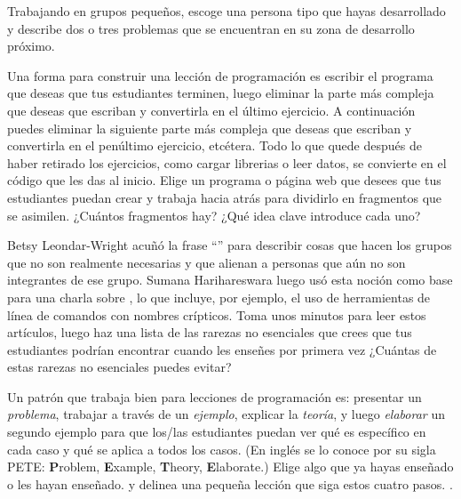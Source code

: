 Trabajando en grupos pequeños,
escoge una persona tipo que hayas desarrollado
y describe dos o tres problemas que se encuentran en su zona de desarrollo próximo.
 
 
Una forma para construir una lección de programación
es escribir el programa que deseas que tus estudiantes terminen,
luego eliminar la parte más compleja que deseas que escriban
y convertirla en el último ejercicio.
A continuación puedes eliminar la siguiente parte más compleja que deseas que escriban
y convertirla en el penúltimo ejercicio, etcétera.
Todo lo que quede después de haber retirado los ejercicios,
como cargar librerias o leer datos,
se convierte en el código que les das al inicio.
 Elige un programa o página web que desees que
tus estudiantes puedan crear
y trabaja hacia atrás para dividirlo en fragmentos que se asimilen.
¿Cuántos fragmentos hay?
¿Qué idea clave introduce cada uno?
 
 
Betsy Leondar-Wright acuñó la frase
``''
para describir cosas que hacen los grupos
que no son realmente necesarias y
que alienan a personas que aún no son integrantes de ese grupo.
Sumana Harihareswara luego usó esta noción
como base para una charla sobre
,
lo que incluye, por ejemplo, el uso de herramientas de línea de comandos con nombres crípticos.
Toma unos minutos para leer estos artículos,
luego haz una lista de las rarezas no esenciales que crees
que tus estudiantes podrían encontrar
cuando les enseñes por primera vez
¿Cuántas de estas rarezas no esenciales puedes evitar?
 

Un patrón que trabaja bien para lecciones de programación es:
presentar un \emph{problema},
trabajar a través de un \emph{ejemplo},
explicar la \emph{teoría},
y luego \emph{elaborar} un segundo ejemplo
para que los/las estudiantes puedan ver qué es específico en cada caso
y qué se aplica a todos los casos. (En inglés se lo conoce por su sigla PETE: 
\textbf{P}roblem, \textbf{E}xample, \textbf{T}heory, \textbf{E}laborate.)
Elige algo que ya hayas enseñado o les hayan enseñado.
y delinea una pequeña lección que siga estos cuatro pasos.
.

